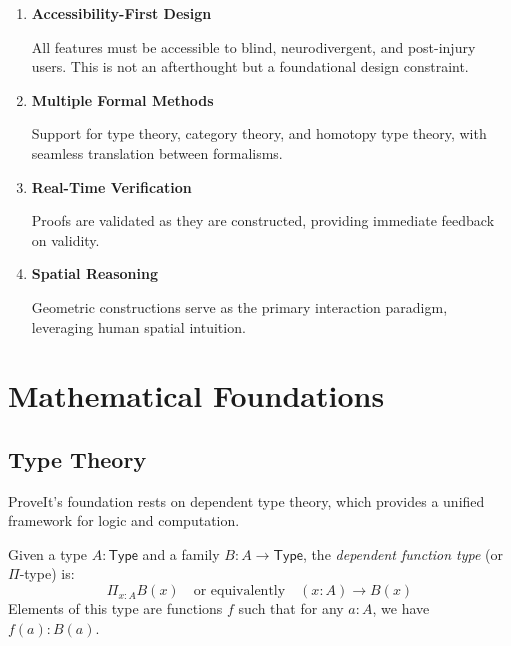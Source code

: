 \documentclass[11pt,a4paper,twoside]{report}
\newcommand{\Type}{\mathsf{Type}}
\newcommand{\Pi}[2]{\prod_{#1} #2}
\begin{document}
\begin{enumerate}[label=\textbf{\arabic*.}, leftmargin=*, itemsep=10pt]
    \item \textbf{Accessibility-First Design}

    All features must be accessible to blind, neurodivergent, and post-injury users. This is not an afterthought but a foundational design constraint.

    \item \textbf{Multiple Formal Methods}

    Support for type theory, category theory, and homotopy type theory, with seamless translation between formalisms.

    \item \textbf{Real-Time Verification}

    Proofs are validated as they are constructed, providing immediate feedback on validity.

    \item \textbf{Spatial Reasoning}

    Geometric constructions serve as the primary interaction paradigm, leveraging human spatial intuition.
\end{enumerate}

\chapter{Mathematical Foundations}
\label{chap:foundations}

\section{Type Theory}

ProveIt's foundation rests on dependent type theory, which provides a unified framework for logic and computation.

\begin{definition}
\label{def:pi-type}
Given a type $A : \Type$ and a family $B : A \to \Type$, the \emph{dependent function type} (or $\Pi$-type) is:
\[
    \Pi_{x : A} B(x) \quad \text{or equivalently} \quad (x : A) \to B(x)
\]
Elements of this type are functions $f$ such that for any $a : A$, we have $f(a) : B(a)$.
\end{definition}
\end{document}
